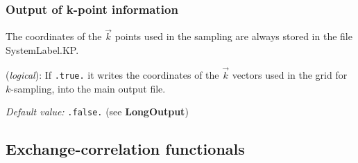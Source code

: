 \subsubsection{Output of k-point information}

The coordinates of the $\vec k$ points used in the sampling
are always stored in the file SystemLabel.KP.

\begin{description}
\itemsep 10pt
\parsep 0pt
\item[\textbf{WriteKpoints}] (\textit{logical}):
If \texttt{.true.} it writes the coordinates of the $\vec k$ vectors
used in the grid for $k$-sampling, into the main output file.

\textit{Default value:} \texttt{.false.} (see \textbf{LongOutput})

\end{description}

\vspace{5pt}
\subsection{Exchange-correlation functionals}

